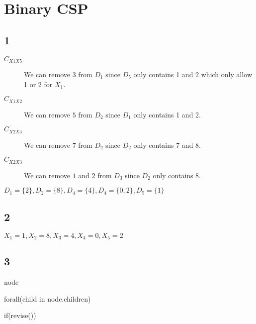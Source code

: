 \section{Binary CSP}
\subsection{1}


\begin{description}
	\item[$C_{X1X5}$] We can remove $3$ from $D_{1}$ since $D_5$ only contains 1 and 2 which only allow 1 or 2 for $X_1$.
	\item[$C_{X1X2}$] We can remove $5$ from $D_{2}$ since $D_1$ only contains 1 and 2.
	\item[$C_{X2X4}$] We can remove $7$ from $D_{2}$ since $D_2$ only contains 7 and 8.
	\item[$C_{X2X3}$] We can remove $1$ and $2$ from $D_{3}$ since $D_2$ only contains 8.
\end{description}


$D_1 = \{2\}, D_2 = \{8\}, D_4 = \{4\}, D_4 = \{0, 2\}, D_5 = \{1\}$
\subsection{2}


$X_1 = 1, X_2 = 8, X_3 = 4, X_4 = 0, X_5 = 2$

\subsection{3}

node

forall(child in node.children){
	if(revise()){
		
	}
}